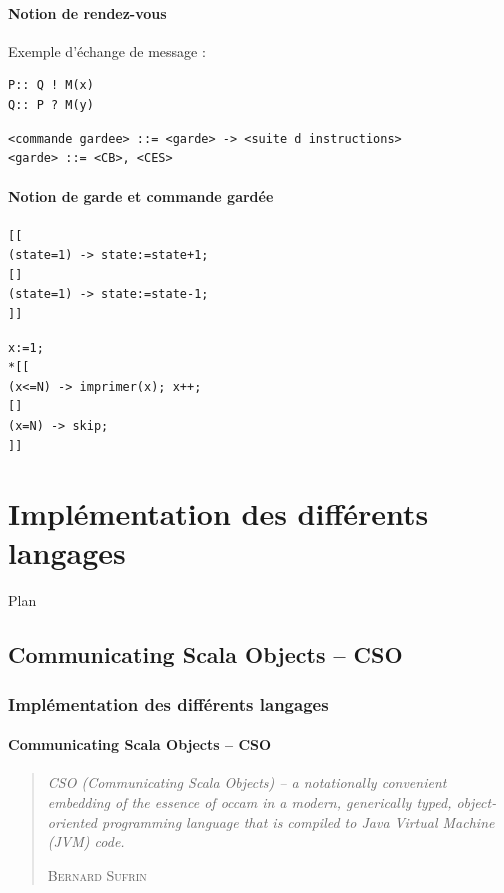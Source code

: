 \documentclass[slidetop,11pt]{beamer}
\begin{document}
\begin{frame} [containsverbatim]
\framesubtitle{Notion de rendez-vous}
Exemple d'échange de message :
\begin{lstlisting}[frame=trBL]
P:: Q ! M(x)
Q:: P ? M(y)
\end{lstlisting}

 \begin{lstlisting}[frame=trBL]
<commande gardee> ::= <garde> -> <suite d instructions>
<garde> ::= <CB>, <CES>
\end{lstlisting}
\end{frame}

\begin{frame} [containsverbatim]
\framesubtitle{Notion de garde et commande gardée}



\begin{lstlisting}[frame=trBL,title={Sélective}]
[[
(state=1) -> state:=state+1;
[]
(state=1) -> state:=state-1;
]]
\end{lstlisting}

\begin{lstlisting}[frame=trBL,title={Répétitive}]
x:=1;
*[[
(x<=N) -> imprimer(x); x++;
[]
(x=N) -> skip;
]]
\end{lstlisting}
\end{frame}

\section{Implémentation des différents langages}
\begin{frame}{Plan}
  \tableofcontents[sections=\thesection]
\end{frame}

\subsection{Communicating Scala Objects – CSO}
\begin{frame} 
  \frametitle{Implémentation des différents langages}
  \framesubtitle{Communicating Scala Objects – CSO}
  \begin{quotation}
     \textit{\og CSO (Communicating Scala Objects) – a notationally convenient embedding of the essence of occam in a modern, generically typed, object-oriented programming language that is compiled to Java Virtual Machine (JVM) code.\fg}
   \begin{flushright}
\textsc{Bernard Sufrin}
\end{flushright}
\end{quotation}   
\end{frame}
\end{document}
